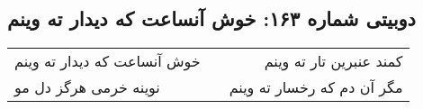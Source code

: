 \begin{center}
\section*{دوبیتی شماره ۱۶۳: خوش آنساعت که دیدار ته وینم}
\label{sec:163}
\begin{longtable}{l p{0.5cm} r}
خوش آنساعت که دیدار ته وینم
&&
کمند عنبرین تار ته وینم
\\
نوینه خرمی هرگز دل مو
&&
مگر آن دم که رخسار ته وینم
\\
\end{longtable}
\end{center}
